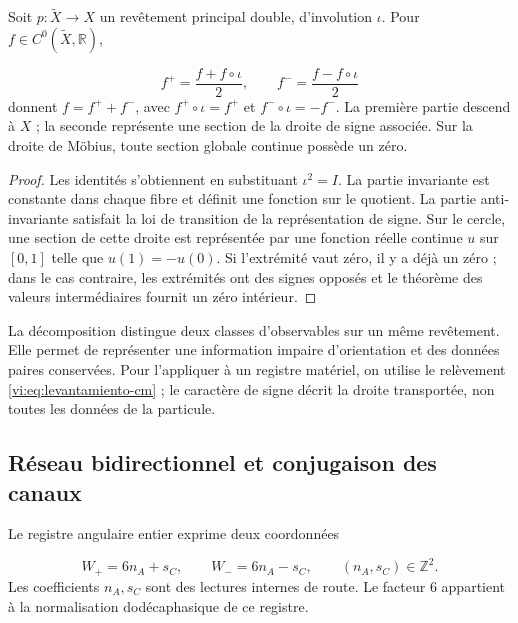 \begin{proposition}
\label{vi:prop:observables-paridad}
Soit $p:\widetilde X\to X$ un revêtement principal double, d’involution
$\iota$. Pour $f\in C^0(\widetilde X,\mathbb R)$,

\[
 f^+=\frac{f+f\circ\iota}{2},\qquad
 f^-=\frac{f-f\circ\iota}{2}
\]
donnent $f=f^++f^-$, avec $f^+\circ\iota=f^+$ et
$f^-\circ\iota=-f^-$. La première partie descend à $X$ ; la
seconde représente une section de la droite de signe associée. Sur
la droite de Möbius, toute section globale continue possède un zéro.

\end{proposition}
\begin{proof}
Les identités s’obtiennent en substituant $\iota^2=I$. La partie
invariante est constante dans chaque fibre et définit une fonction sur le
quotient. La partie anti-invariante satisfait la loi de transition
de la représentation de signe. Sur le cercle, une section de cette
droite est représentée par une fonction réelle continue $u$ sur $[0,1]$
telle que $u(1)=-u(0)$. Si l’extrémité vaut zéro, il y a déjà un zéro ; dans le cas
contraire, les extrémités ont des signes opposés et le théorème des
valeurs intermédiaires fournit un zéro intérieur.

\end{proof}

La décomposition distingue deux classes d’observables sur un
même revêtement. Elle permet de représenter une information impaire d’orientation
et des données paires conservées. Pour l’appliquer à un registre matériel, on
utilise le relèvement \eqref{vi:eq:levantamiento-cm} ; le caractère
de signe décrit la droite transportée, non toutes les données de la
particule.


\subsection{Réseau bidirectionnel et conjugaison des canaux
}
\label{vi:subsec:reticulo-bidireccional}

Le registre angulaire entier exprime deux coordonnées

\begin{equation}
 W_+=6n_A+s_C,\qquad W_-=6n_A-s_C,
 \qquad (n_A,s_C)\in\mathbb Z^2.
 \label{vi:eq:reticulo-ida-retorno}
\end{equation}
Les coefficients $n_A,s_C$ sont des lectures internes de route. Le facteur
$6$ appartient à la normalisation dodécaphasique de ce registre.


